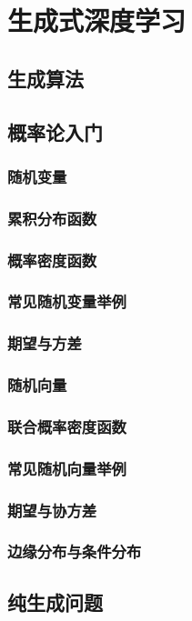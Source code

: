 \chapter{生成式深度学习}

\section{生成算法}

\section{概率论入门}
\subsection{随机变量}
\subsection{累积分布函数}
\subsection{概率密度函数}
\subsection{常见随机变量举例}
\subsection{期望与方差}
\subsection{随机向量}
\subsection{联合概率密度函数}
\subsection{常见随机向量举例}
\subsection{期望与协方差}
\subsection{边缘分布与条件分布}

\section{纯生成问题}
